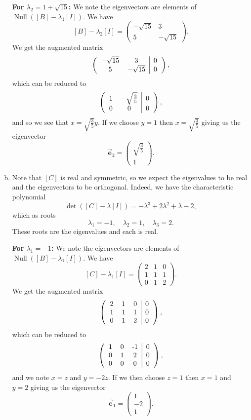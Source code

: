 \documentclass[12pt]{article} %
\newcommand{\Null}{\operatorname{Null}}
\newcommand{\evec}{\vec{\boldsymbol{e}}}
\begin{document}
\begin{solution}
\begin{enumerate}[(a)]
    \noindent\textbf{For $\lambda_2 = 1+\sqrt{15}$:} We note the eigenvectors are elements of $\Null([B]-\lambda_1[I])$.  We have
    \[
    [B]-\lambda_2 [I] = \begin{pmatrix} -\sqrt{15} & 3 \\ 5 & -\sqrt{15} \end{pmatrix}.
    \]
    We get the augmented matrix
    \[
        \left(\begin{tabular}{cc|c} $-\sqrt{15}$ & 3 & 0 \\ 5 & $-\sqrt{15}$ & 0 \end{tabular}\right),
    \]
    which can be reduced to
    \[
        \left(\begin{tabular}{cc|c} $1$ & $-\sqrt{\frac{3}{5}}$ & 0 \\ 0 & 0 & 0 \end{tabular}\right),
    \]
    and so we see that $x=\sqrt{\frac{3}{5}}y$. If we choose $y=1$ then $x=\sqrt{\frac{3}{5}}$ giving us the eigenvector
    \[
    \evec_2 = \begin{pmatrix} \sqrt{\frac{3}{5}} \\ 1 \end{pmatrix}.
    \]

    \item Note that $[C]$ is real and symmetric, so we expect the eigenvalues to be real and the eigenvectors to be orthogonal. Indeed, we have the characteristic polynomial
    \[
    \det([C]-\lambda [I]) = -\lambda^3 + 2\lambda^2 + \lambda -2,
    \]
    which as roots
    \[
    \lambda_1 = -1, \quad \lambda_2 = 1, \quad \lambda_3 = 2.
    \]
    These roots are the eigenvalues and each is real.

    \noindent\textbf{For $\lambda_1 = -1$:} We note the eigenvectors are elements of $\Null([B]-\lambda_1[I])$.  We have
    \[
    [C]-\lambda_1 [I] = \begin{pmatrix} 2 & 1 & 0 \\ 1 & 1 & 1 \\ 0 & 1 & 2 \end{pmatrix}.
    \]
    We get the augmented matrix
    \[
        \left(\begin{tabular}{ccc|c} 2 & 1 & 0 & 0 \\ 1 & 1 & 1 & 0 \\ 0 & 1 & 2 & 0 \end{tabular}\right),
    \]
    which can be reduced to
    \[
        \left(\begin{tabular}{ccc|c} 1 & 0 & -1 & 0 \\ 0 & 1 & 2 & 0 \\ 0 & 0 & 0 & 0 \end{tabular}\right),
    \]
    and we note $x=z$ and $y=-2z$. If we then choose $z=1$ then $x=1$ and $y=2$ giving us the eigenvector
    \[
    \evec_1 = \begin{pmatrix} 1 \\ -2 \\ 1 \end{pmatrix}.
    \]


\end{enumerate}
\end{solution}
\end{document}
